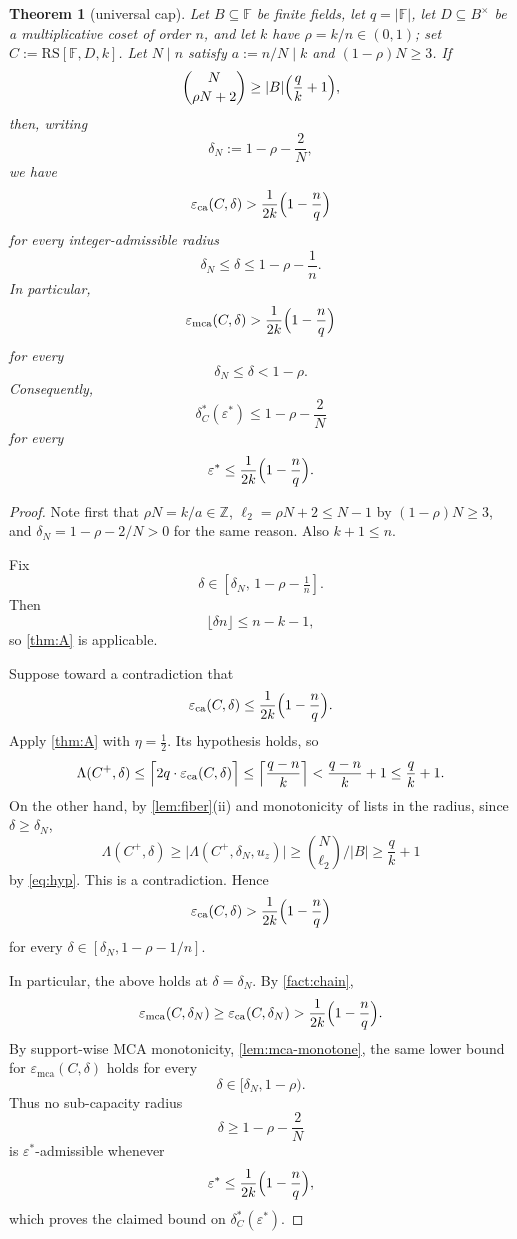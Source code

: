\documentclass[11pt]{article}
\newtheorem{theorem}{Theorem}[section]
\theoremstyle{definition}
\theoremstyle{remark}
\newcommand{\F}{\mathbb{F}}
\newcommand{\B}{B}
\newcommand{\RS}{\mathrm{RS}}
\newcommand{\eca}{\varepsilon_{\mathrm{ca}}}
\newcommand{\emca}{\varepsilon_{\mathrm{mca}}}
\newcommand{\Lst}{\Lambda}
\begin{document}
\begin{theorem}[universal cap]\label{thm:main}
Let $\B\subseteq\F$ be finite fields, let $q=|\F|$, let $D\subseteq\B^\times$ be a multiplicative coset of order $n$, and let $k$ have $\rho=k/n\in(0,1)$; set $C:=\RS[\F,D,k]$. Let $N\mid n$ satisfy $a:=n/N\mid k$ and $(1-\rho)N\ge3$. If
\begin{equation}\label{eq:hyp}
        \binom{N}{\rho N+2}
        \ge
        |\B|\Bigl(\frac qk+1\Bigr),
\end{equation}
then, writing
\[
        \delta_N:=1-\rho-\frac2N,
\]
we have
\[
\eca(C,\delta)
>
\frac1{2k}\Bigl(1-\frac nq\Bigr)
\]
for every integer-admissible radius
\[
        \delta_N\le \delta \le 1-\rho-\frac1n .
\]
In particular,
\[
        \emca(C,\delta)
        >
        \frac1{2k}\Bigl(1-\frac nq\Bigr)
\]
for every
\[
        \delta_N\le \delta < 1-\rho .
\]
Consequently,
\[
        \delta^*_C(\varepsilon^*)
        \le
        1-\rho-\frac2N
\]
for every
\[
        \varepsilon^*
        \le
        \frac1{2k}\Bigl(1-\frac nq\Bigr).
\]
\end{theorem}

\begin{proof}
Note first that $\rho N=k/a\in\mathbb Z$, $\ell_2=\rho N+2\le N-1$ by $(1-\rho)N\ge3$, and $\delta_N=1-\rho-2/N>0$ for the same reason. Also $k+1\le n$.

Fix
\[
        \delta\in[\delta_N,\,1-\rho-\tfrac1n].
\]
Then
\[
        \lfloor \delta n\rfloor \le n-k-1,
\]
so \cref{thm:A} is applicable.

Suppose toward a contradiction that
\[
        \eca(C,\delta)
        \le
        \frac1{2k}\Bigl(1-\frac nq\Bigr).
\]
Apply \cref{thm:A} with $\eta=\frac12$. Its hypothesis holds, so
\[
        \Lst(C^+,\delta)
        \le
        \Bigl\lceil 2q\cdot \eca(C,\delta)\Bigr\rceil
        \le
        \Bigl\lceil\frac{q-n}{k}\Bigr\rceil
        <
        \frac{q-n}{k}+1
        \le
        \frac qk+1 .
\]
On the other hand, by \cref{lem:fiber}(ii) and monotonicity of lists in the radius, since $\delta\ge\delta_N$,
\[
        \Lst(C^+,\delta)
        \ge
        \bigl|\Lst(C^+,\delta_N,u_z)\bigr|
        \ge
        \binom{N}{\ell_2}\Big/|\B|
        \ge
        \frac qk+1
\]
by \eqref{eq:hyp}. This is a contradiction. Hence
\[
        \eca(C,\delta)
        >
        \frac1{2k}\Bigl(1-\frac nq\Bigr)
\]
for every $\delta\in[\delta_N,1-\rho-1/n]$.

In particular, the above holds at $\delta=\delta_N$. By \cref{fact:chain},
\[
        \emca(C,\delta_N)
        \ge
        \eca(C,\delta_N)
        >
        \frac1{2k}\Bigl(1-\frac nq\Bigr).
\]
By support-wise MCA monotonicity, \cref{lem:mca-monotone}, the same lower bound for $\emca(C,\delta)$ holds for every
\[
        \delta\in[\delta_N,1-\rho).
\]
Thus no sub-capacity radius
\[
        \delta\ge 1-\rho-\frac2N
\]
is $\varepsilon^*$-admissible whenever
\[
        \varepsilon^*
        \le
        \frac1{2k}\Bigl(1-\frac nq\Bigr),
\]
which proves the claimed bound on $\delta^*_C(\varepsilon^*)$.
\end{proof}
\end{document}
